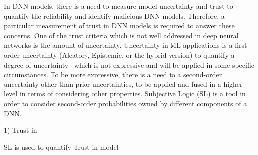 In DNN models, there is a need to measure model uncertainty and trust to quantify the reliability and identify malicious DNN models. 
Therefore, a particular measurement of trust in DNN models is required to answer these concerns. 
One of the trust criteria which is not well addressed in deep neural networks is the amount of uncertainty. Uncertainty in ML applications is a first-order uncertainty (Aleatory, Epistemic, or the hybrid version) to quantify a degree of uncertainty~\cite{uncer-rev} which is not expressive and will be applied in some specific circumstances. To be more expressive, there is a need to a second-order uncertainty other than prior uncertainties, to be applied and fused in a higher level in terms of considering other properties. Subjective Logic (SL) is a tool in order to consider second-order probabilities owned by different components of a DNN. 

1) Trust in  

SL is used to quantify Trust in model

